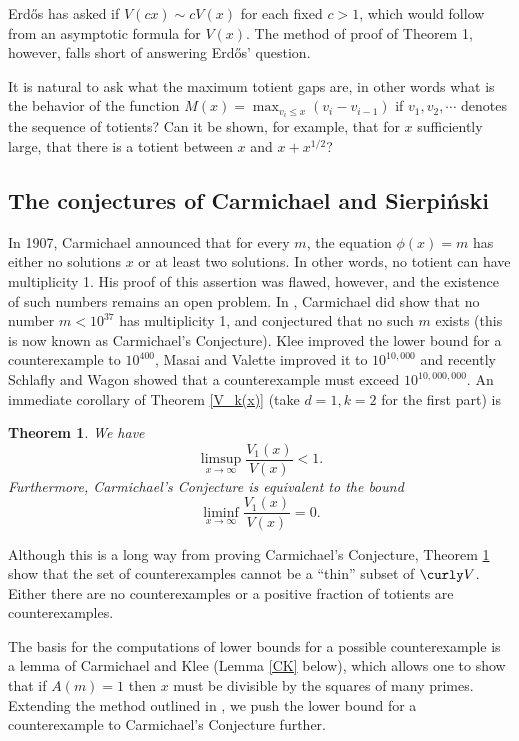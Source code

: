 \documentclass[11pt]{amsart}
\theoremstyle{remark}
\theoremstyle{plain}
\newtheorem{thm}{Theorem}
\numberwithin{equation}{section}
\renewcommand{\(}{\left(}
\renewcommand{\)}{\right)}
\newcommand{\fancyV}{\curly V}
\renewcommand{\le}{\leqslant}
\begin{document}
Erd\H os has asked if $V(cx) \sim cV(x)$ for each fixed $c>1$, which would
follow from an asymptotic formula for $V(x)$.  The method of proof of
Theorem 1, however, falls short of answering Erd\H os' question.

It is natural to ask what the maximum totient gaps are, in other words
what is the behavior of the function $M(x)=\max_{v_i\le x} (v_i-v_{i-1})$
if $v_1, v_2, \cdots$ denotes the sequence of totients?  Can it be 
shown, for example,
 that for $x$ sufficiently large, that there is a totient between
$x$ and $x+x^{1/2}$?





\subsection{The conjectures of Carmichael and Sierpi\'nski}

 In 1907, Carmichael \cite{C1} announced that for every $m$, the equation
$\phi(x)=m$ has either no solutions $x$ or at least two solutions.  In
other words, no totient can have multiplicity 1.  His proof of this
assertion was flawed, however, and the existence of such numbers
remains an open problem.  In \cite{C2}, Carmichael did show that no
number $m<10^{37}$ has multiplicity 1, and conjectured that no such $m$
exists (this is now known as Carmichael's Conjecture).  Klee \cite{K}
improved the lower bound for a counterexample to $10^{400}$,
Masai and Valette \cite{MV} improved it to $10^{10,000}$ and recently
Schlafly and Wagon \cite{SW} showed that a counterexample must exceed
$10^{10,000,000}$.
An immediate corollary of Theorem \ref{V_k(x)} 
(take $d=1, k=2$ for the first part) is

\begin{thm}\label{Car Conj}
We have
$$
\limsup_{x\to\infty} \frac{V_1(x)}{V(x)} < 1.
$$
Furthermore, Carmichael's Conjecture
is equivalent to the bound
$$
\liminf_{x\to\infty} \frac{V_1(x)}{V(x)} = 0.
$$
\end{thm}

Although this is a long way from proving Carmichael's Conjecture, Theorem
\ref{Car Conj} show that the set of counterexamples
cannot be a ``thin'' subset of $\fancyV$.  Either
there are no counterexamples or a positive fraction of totients are
counterexamples.

The basis for the computations of lower bounds for
a possible counterexample is a lemma of Carmichael
and Klee (Lemma \ref{CK} below), which allows one to show that if $A(m)=1$ then $x$
must be divisible by the squares of many primes. Extending the method
outlined in \cite{SW}, we push the lower bound for a
counterexample to Carmichael's Conjecture further.
\end{document}
